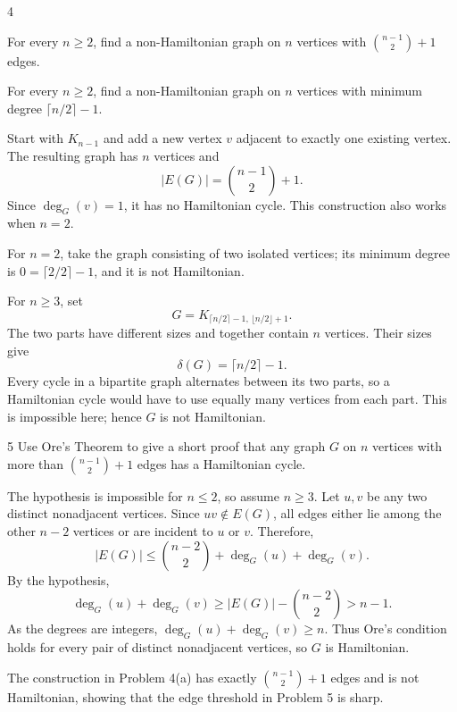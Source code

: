 \documentclass[11pt,oneside]{article}
\begin{document}
\begin{problem}{4}
\begin{problemsubparts}
    \item For every $n\geq2$, find a non-Hamiltonian graph on $n$ vertices
    with $\binom{n-1}{2}+1$ edges.
    \item For every $n\geq2$, find a non-Hamiltonian graph on $n$ vertices
    with minimum degree $\lceil n/2\rceil-1$.
\end{problemsubparts}
\end{problem}

\begin{solution}
\begin{problemsubparts}
\item Start with $K_{n-1}$ and add a new vertex $v$ adjacent to exactly one
existing vertex. The resulting graph has $n$ vertices and
\[
    |E(G)|=\binom{n-1}{2}+1.
\]
Since $\deg_G(v)=1$, it has no Hamiltonian cycle. This construction also
works when $n=2$.

\item For $n=2$, take the graph consisting of two isolated vertices;
its minimum degree is $0=\lceil2/2\rceil-1$, and it is not Hamiltonian.

For $n\geq3$, set
\[
    G=K_{\lceil n/2\rceil-1,\,\lfloor n/2\rfloor+1}.
\]
The two parts have different sizes and together contain $n$ vertices.
Their sizes give
\[
    \delta(G)=\lceil n/2\rceil-1.
\]
Every cycle in a bipartite graph alternates between its two parts,
so a Hamiltonian cycle would have to use equally many vertices from
each part. This is impossible here; hence $G$ is not Hamiltonian.
\end{problemsubparts}
\end{solution}

\begin{problem}{5}
Use Ore's Theorem to give a short proof that any graph $G$ on $n$ vertices
with more than $\binom{n-1}{2}+1$ edges has a Hamiltonian cycle.
\end{problem}

\begin{solution}
The hypothesis is impossible for $n\leq2$, so assume $n\geq3$.
Let $u,v$ be any two distinct nonadjacent vertices. Since $uv\notin E(G)$,
all edges either lie among the other $n-2$ vertices or are incident to $u$
or $v$. Therefore,
\[
    |E(G)|\leq\binom{n-2}{2}+\deg_G(u)+\deg_G(v).
\]
By the hypothesis,
\[
    \deg_G(u)+\deg_G(v)
    \geq |E(G)|-\binom{n-2}{2}
    >n-1.
\]
As the degrees are integers, $\deg_G(u)+\deg_G(v)\geq n$.
Thus Ore's condition holds for every pair of distinct nonadjacent vertices,
so $G$ is Hamiltonian.
\end{solution}

\begin{remark}
The construction in Problem 4(a) has exactly
$\binom{n-1}{2}+1$ edges and is not Hamiltonian, showing that the
edge threshold in Problem 5 is sharp.
\end{remark}
\end{document}
